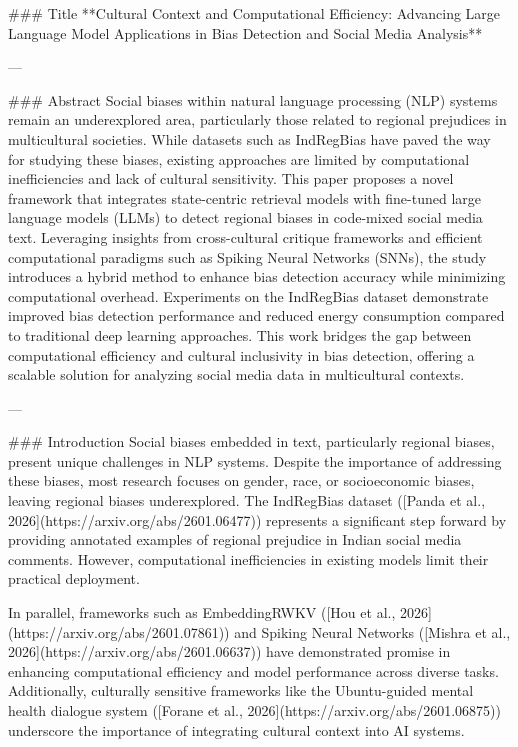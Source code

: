 ### Title  
**Cultural Context and Computational Efficiency: Advancing Large Language Model Applications in Bias Detection and Social Media Analysis**

---

### Abstract  
Social biases within natural language processing (NLP) systems remain an underexplored area, particularly those related to regional prejudices in multicultural societies. While datasets such as IndRegBias have paved the way for studying these biases, existing approaches are limited by computational inefficiencies and lack of cultural sensitivity. This paper proposes a novel framework that integrates state-centric retrieval models with fine-tuned large language models (LLMs) to detect regional biases in code-mixed social media text. Leveraging insights from cross-cultural critique frameworks and efficient computational paradigms such as Spiking Neural Networks (SNNs), the study introduces a hybrid method to enhance bias detection accuracy while minimizing computational overhead. Experiments on the IndRegBias dataset demonstrate improved bias detection performance and reduced energy consumption compared to traditional deep learning approaches. This work bridges the gap between computational efficiency and cultural inclusivity in bias detection, offering a scalable solution for analyzing social media data in multicultural contexts.

---

### Introduction  
Social biases embedded in text, particularly regional biases, present unique challenges in NLP systems. Despite the importance of addressing these biases, most research focuses on gender, race, or socioeconomic biases, leaving regional biases underexplored. The IndRegBias dataset ([Panda et al., 2026](https://arxiv.org/abs/2601.06477)) represents a significant step forward by providing annotated examples of regional prejudice in Indian social media comments. However, computational inefficiencies in existing models limit their practical deployment.

In parallel, frameworks such as EmbeddingRWKV ([Hou et al., 2026](https://arxiv.org/abs/2601.07861)) and Spiking Neural Networks ([Mishra et al., 2026](https://arxiv.org/abs/2601.06637)) have demonstrated promise in enhancing computational efficiency and model performance across diverse tasks. Additionally, culturally sensitive frameworks like the Ubuntu-guided mental health dialogue system ([Forane et al., 2026](https://arxiv.org/abs/2601.06875)) underscore the importance of integrating cultural context into AI systems.

